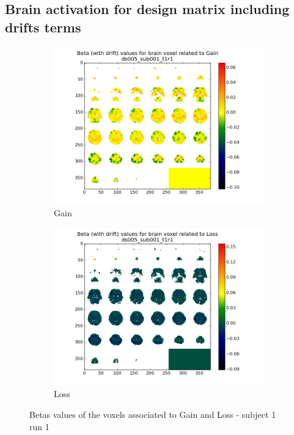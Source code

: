 \subsection{Brain activation for design matrix including drifts terms}
\begin{figure}[H]
\begin{subfigure}{.5\textwidth}
  \centering
  \includegraphics[width=.9\linewidth]{../fig/mosaic/ds005_sub001_t1r1_withdrift_Gain.png}
  \caption{Gain}
  \label{fig:sfig1}
\end{subfigure}%
\begin{subfigure}{.5\textwidth}
  \centering
  \includegraphics[width=.9\linewidth]{../fig/mosaic/ds005_sub001_t1r1_withdrift_Loss.png}
  \caption{Loss}
  \label{fig:sfig2}
\end{subfigure}
\caption{Betas values of the voxels associated to Gain and Loss - subject 1 run 1}
\label{fig:fig}
\end{figure}

